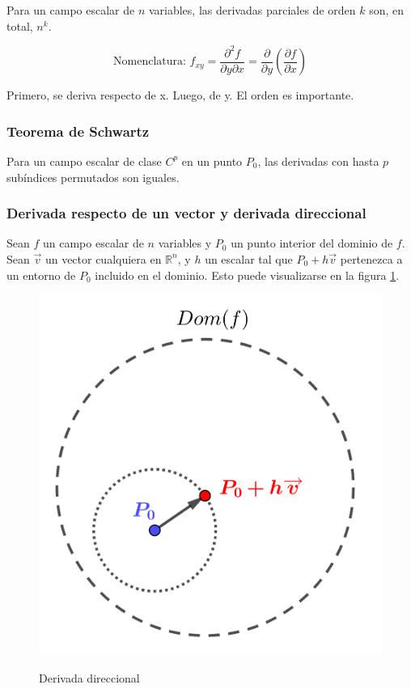 \documentclass{article}
\renewcommand{\Bbb}{\mathbb}
\begin{document}
Para un campo escalar de $n$ variables, las derivadas parciales de orden $k$ son, en total, $n^k$.

\begin{equation}
\text{Nomenclatura:  } f_{xy} = \frac{\partial^2 f}{\partial y \partial x } = \frac{\partial}{\partial y} \left( \frac{\partial f}{\partial x} \right)
\end{equation}

Primero, se deriva respecto de x. Luego, de y. El orden es importante.

\subsubsection{Teorema de Schwartz}

Para un campo escalar de clase $C^p$ en un punto $P_0$, las derivadas con hasta $p$ subíndices permutados son iguales.

\subsubsection{Derivada respecto de un vector y derivada direccional}

Sean $f$ un campo escalar de $n$ variables y $P_0$ un punto interior del dominio de $f$. Sean $\overrightarrow{v}$ un vector cualquiera en $\Bbb R^n$, y $h$ un escalar tal que $P_0 + h \overrightarrow{v}$ pertenezca a un entorno de $P_0$ incluido en el dominio. Esto puede visualizarse en la figura \ref{fig:deriv_direcc}.

\begin{figure}[ht]
\centering
\caption{Derivada direccional}
\includegraphics[scale=0.75]{img/teo_fig009_deriv_direcc.png}
\label{fig:deriv_direcc}
\end{figure}
\end{document}
